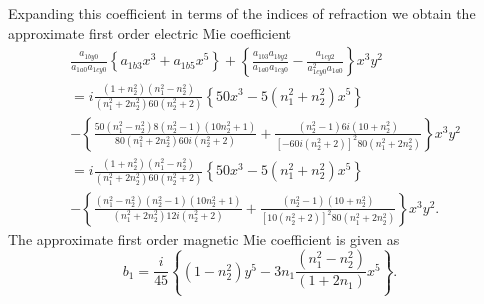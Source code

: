 \documentclass[aps,preprint]{revtex4}%
\begin{document}
Expanding this coefficient in terms of the indices of refraction we obtain the
approximate first order electric Mie coefficient
\begin{align}
&  \frac{a_{1by0}}{a_{1a0}a_{1cy0}}\left\{  a_{1b3}x^{3}+a_{1b5}x^{5}\right\}
+\left\{  \frac{a_{1b3}a_{1by2}}{a_{1a0}a_{1cy0}}-\frac{a_{1cy2}}{a_{1cy0}%
^{2}a_{1a0}}\right\}  x^{3}y^{2}\nonumber\\
&  =i\frac{\left(  1+n_{2}^{2}\right)  \left(  n_{1}^{2}-n_{2}^{2}\right)
}{\left(  n_{1}^{2}+2n_{2}^{2}\right)  60\left(  n_{2}^{2}+2\right)  }\left\{
50x^{3}-5\left(  n_{1}^{2}+n_{2}^{2}\right)  x^{5}\right\} \nonumber\\
&  -\left\{  \frac{50\left(  n_{1}^{2}-n_{2}^{2}\right)  8\left(  n_{2}%
^{2}-1\right)  \left(  10n_{2}^{2}+1\right)  }{80\left(  n_{1}^{2}+2n_{2}%
^{2}\right)  60i\left(  n_{2}^{2}+2\right)  }+\frac{\left(  n_{2}%
^{2}-1\right)  6i\left(  10+n_{2}^{2}\right)  }{\left[  -60i\left(  n_{2}%
^{2}+2\right)  \right]  ^{2}80\left(  n_{1}^{2}+2n_{2}^{2}\right)  }\right\}
x^{3}y^{2}\nonumber\\
&  =i\frac{\left(  1+n_{2}^{2}\right)  \left(  n_{1}^{2}-n_{2}^{2}\right)
}{\left(  n_{1}^{2}+2n_{2}^{2}\right)  60\left(  n_{2}^{2}+2\right)  }\left\{
50x^{3}-5\left(  n_{1}^{2}+n_{2}^{2}\right)  x^{5}\right\} \nonumber\\
&  -\left\{  \frac{\left(  n_{1}^{2}-n_{2}^{2}\right)  \left(  n_{2}%
^{2}-1\right)  \left(  10n_{2}^{2}+1\right)  }{\left(  n_{1}^{2}+2n_{2}%
^{2}\right)  12i\left(  n_{2}^{2}+2\right)  }+\frac{\left(  n_{2}%
^{2}-1\right)  \left(  10+n_{2}^{2}\right)  }{\left[  10\left(  n_{2}%
^{2}+2\right)  \right]  ^{2}80\left(  n_{1}^{2}+2n_{2}^{2}\right)  }\right\}
x^{3}y^{2}.
\end{align}
The approximate first order magnetic Mie coefficient is given as
\begin{equation}
b_{1}=\frac{i}{45}\left\{  \left(  1-n_{2}^{2}\right)  y^{5}-3n_{1}%
\frac{\left(  n_{1}^{2}-n_{2}^{2}\right)  }{\left(  1+2n_{1}\right)  }%
x^{5}\right\}  .
\end{equation}
\end{document}
